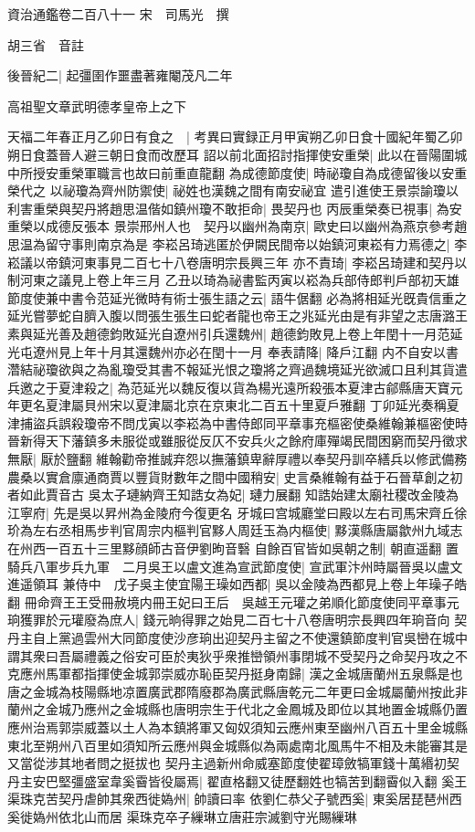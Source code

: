 資治通鑑卷二百八十一
宋　司馬光　撰

胡三省　音註

後晉紀二|{
	起彊圉作噩盡著雍閹茂凡二年}


高祖聖文章武明德孝皇帝上之下

天福二年春正月乙卯日有食之　|{
	考異曰實録正月甲寅朔乙卯日食十國紀年蜀乙卯朔日食蓋晉人避三朝日食而改歷耳}
詔以前北面招討指揮使安重榮|{
	此以在晉陽圍城中所授安重榮軍職言也故曰前重直龍翻}
為成德節度使|{
	時祕瓊自為成德留後以安重榮代之}
以祕瓊為齊州防禦使|{
	祕姓也漢魏之間有南安祕宜}
遣引進使王景崇諭瓊以利害重榮與契丹將趙思温偕如鎮州瓊不敢拒命|{
	畏契丹也}
丙辰重榮奏已視事|{
	為安重榮以成德反張本}
景崇邢州人也　契丹以幽州為南京|{
	歐史曰以幽州為燕京參考趙思温為留守事則南京為是}
李崧呂琦逃匿於伊闕民間帝以始鎮河東崧有力焉德之|{
	李崧議以帝鎮河東事見二百七十八卷唐明宗長興三年}
亦不責琦|{
	李崧呂琦建和契丹以制河東之議見上卷上年三月}
乙丑以琦為祕書監丙寅以崧為兵部侍郎判戶部初天雄節度使兼中書令范延光微時有術士張生語之云|{
	語牛倨翻}
必為將相延光旣貴信重之延光嘗夢蛇自臍入腹以問張生張生曰蛇者龍也帝王之兆延光由是有非望之志唐潞王素與延光善及趙德鈞敗延光自遼州引兵還魏州|{
	趙德鈞敗見上卷上年閏十一月范延光屯遼州見上年十月其還魏州亦必在閏十一月}
奉表請降|{
	降戶江翻}
内不自安以書濳結祕瓊欲與之為亂瓊受其書不報延光恨之瓊將之齊過魏境延光欲滅口且利其貨遣兵邀之于夏津殺之|{
	為范延光以魏反復以貨為楊光遠所殺張本夏津古鄃縣唐天寶元年更名夏津屬貝州宋以夏津屬北京在京東北二百五十里夏戶雅翻}
丁卯延光奏稱夏津捕盜兵誤殺瓊帝不問戊寅以李崧為中書侍郎同平章事充樞密使桑維翰兼樞密使時晉新得天下藩鎮多未服從或雖服從反仄不安兵火之餘府庫殫竭民間困窮而契丹徵求無厭|{
	厭於鹽翻}
維翰勸帝推誠弃怨以撫藩鎮卑辭厚禮以奉契丹訓卒繕兵以修武備務農桑以實倉廪通商賈以豐貨財數年之間中國稍安|{
	史言桑維翰有益于石晉草創之初者如此賈音古}
吳太子璉納齊王知誥女為妃|{
	璉力展翻}
知誥始建太廟社稷改金陵為江寧府|{
	先是吳以昇州為金陵府今復更名}
牙城曰宫城廳堂曰殿以左右司馬宋齊丘徐玠為左右丞相馬步判官周宗内樞判官黟人周廷玉為内樞使|{
	黟漢縣唐屬歙州九域志在州西一百五十三里黟顔師古音伊劉昫音䃜}
自餘百官皆如吳朝之制|{
	朝直遥翻}
置騎兵八軍步兵九軍　二月吳王以盧文進為宣武節度使|{
	宣武軍汴州時屬晉吳以盧文進遥領耳}
兼侍中　戊子吳主使宜陽王璪如西都|{
	吳以金陵為西都見上卷上年璪子皓翻}
冊命齊王王受冊赦境内冊王妃曰王后　吳越王元瓘之弟順化節度使同平章事元珦獲罪於元瓘廢為庶人|{
	錢元晌得罪之始見二百七十八卷唐明宗長興四年珦音向}
契丹主自上黨過雲州大同節度使沙彦珦出迎契丹主留之不使還鎮節度判官吳巒在城中謂其衆曰吾屬禮義之俗安可臣於夷狄乎衆推巒領州事閉城不受契丹之命契丹攻之不克應州馬軍都指揮使金城郭崇威亦恥臣契丹挺身南歸|{
	漢之金城唐蘭州五泉縣是也唐之金城為枝陽縣地凉置廣武郡隋廢郡為廣武縣唐乾元二年更曰金城屬蘭州按此非蘭州之金城乃應州之金城縣也唐明宗生于代北之金鳳城及即位以其地置金城縣仍置應州治焉郭崇威蓋以土人為本鎮將軍又匈奴須知云應州東至幽州八百五十里金城縣東北至朔州八百里如須知所云應州與金城縣似為兩處南北風馬牛不相及未能審其是又當從涉其地者問之挺拔也}
契丹主過新州命威塞節度使翟璋斂犒軍錢十萬緡初契丹主安巴堅彊盛室韋奚霫皆役屬焉|{
	翟直格翻又徒歷翻姓也犒苦到翻霫似入翻}
奚王渠珠克苦契丹虐帥其衆西徙媯州|{
	帥讀曰率}
依劉仁恭父子號西奚|{
	東奚居琵琶州西奚徙媯州依北山而居}
渠珠克卒子繅琳立唐莊宗滅劉守光賜繅琳

